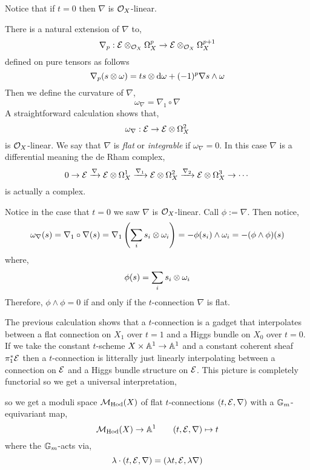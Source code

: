 \documentclass[12pt]{article}
\begin{document}
\begin{rmk}
Notice that if $t = 0$ then $\nabla$ is $\mathcal{O}_{X}$-linear.
\end{rmk}

\begin{defn}
There is a natural extension of $\nabla$ to,
\[ \nabla_p : \mathcal{E} \otimes_{\mathcal{O}_{X}} \Omega^p_X \to \mathcal{E} \otimes_{\mathcal{O}_{X}} \Omega^{p+1}_X \]
defined on pure tensors as follows
\[ \nabla_p(s \otimes \omega) = t s \otimes \mathrm{d}{\omega} + (-1)^p \nabla s \wedge \omega \]
Then we define the curvature of $\nabla$,
\[ \omega_{\nabla} = \nabla_1 \circ \nabla \]
A straightforward calculation shows that,
\[ \omega_{\nabla} : \mathcal{E} \to \mathcal{E} \otimes \Omega^2_X \]
is $\mathcal{O}_{X}$-linear. We say that $\nabla$ is \textit{flat} or \textit{integrable} if $\omega_{\nabla} = 0$. In this case $\nabla$ is a differential meaning the de Rham complex,
\[ 0 \to \mathcal{E} \xrightarrow{\nabla} \mathcal{E} \otimes \Omega^1_X \xrightarrow{\nabla_1} \mathcal{E} \otimes \Omega_X^2 \xrightarrow{\nabla_2} \mathcal{E} \otimes \Omega_X^3 \to \cdots \]
is actually a complex.
\end{defn}

\begin{rmk}
Notice in the case that $t = 0$ we saw $\nabla$ is $\mathcal{O}_{X}$-linear. Call $\phi := \nabla$. Then notice,
\[ \omega_{\nabla}(s) = \nabla_1 \circ \nabla(s) = \nabla_1 \left( \sum_i s_i \otimes \omega_i \right) = - \phi(s_i) \wedge \omega_i = - (\phi \wedge \phi)(s) \] 
where,
\[ \phi(s) = \sum_i s_i \otimes \omega_i \]
Therefore, $\phi \wedge \phi = 0$ if and only if the $t$-connection $\nabla$ is flat. 
\end{rmk}

The previous calculation shows that a $t$-connection is a gadget that interpolates between a flat connection on $X_1$ over $t = 1$ and a Higgs bundle on $X_0$ over $t = 0$. If we take the constant $t$-scheme $X \times \mathbb{A}^1 \to \mathbb{A}^1$ and a constant coherent sheaf $\pi_1^* \mathcal{E}$ then a $t$-connection is litterally just linearly interpolating between a connection on $\mathcal{E}$ and a Higgs bundle structure on $\mathcal{E}$. This picture is completely functorial so we get a universal interpretation,
\begin{center}
\end{center}
so we get a moduli space $\mathcal{M}_{\text{Hod}}(X)$ of flat $t$-connections $(t, \mathcal{E}, \nabla)$ with a ${\mathbb{G}_m}$-equivariant map,
\[ \mathcal{M}_{\text{Hod}}(X) \to \mathbb{A}^1 \quad \quad (t, \mathcal{E}, \nabla) \mapsto t \]
where the ${\mathbb{G}_m}$-acts via,
\[ \lambda \cdot (t, \mathcal{E}, \nabla) = (\lambda t, \mathcal{E}, \lambda \nabla) \]
\end{document}
